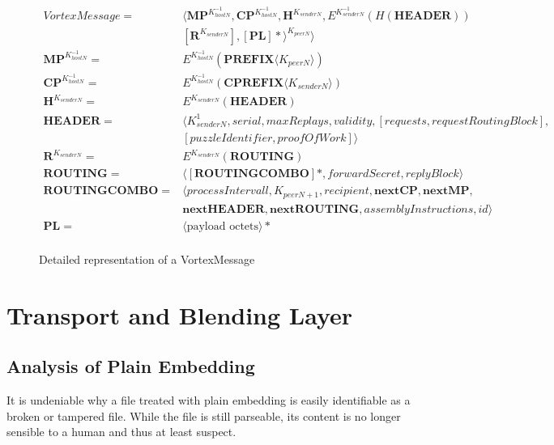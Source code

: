 \begin{figure}[!h]
	\begin{align}
	VortexMessage                = &\langle \mathbf{MP}^{K^{-1}_{hostN}}, \mathbf{CP}^{K^{-1}_{hostN}}, \mathbf{H}^{K_{senderN}}, E^{K^{-1}_{senderN}}\left(H\left(\mathbf{HEADER}\right)\right)  \nonumber \\
	& \left[\mathbf{R}^{K_{senderN}}\right], \left[\mathbf{PL}\right]*\rangle^{K_{peerN}} \rangle\label{eq:vortexMessage}\\ 
	\mathbf{MP}^{K^{-1}_{hostN}} = &E^{K^{-1}_{hostN}}\left(\mathbf{PREFIX}\langle K_{peerN}\rangle \right)\\ 
	\mathbf{CP}^{K^{-1}_{hostN}} = &E^{K^{-1}_{hostN}}\left(\mathbf{CPREFIX}\langle K_{senderN}\rangle \right)\\ 
	\mathbf{H}^{K_{senderN}}     = &E^{K_{senderN}}\left(\mathbf{HEADER}\right)\\  
	\mathbf{HEADER}              = &\langle K^{1}_{senderN}, serial, maxReplays, validity, [requests, requestRoutingBlock],\nonumber\\ 
	& [puzzleIdentifier, proofOfWork] \rangle \\  
	\mathbf{R}^{K_{senderN}}     = & E^{K_{senderN}}\left(\mathbf{ROUTING}\right)\\ 
	\mathbf{ROUTING}             = & \langle [ \mathbf{ROUTINGCOMBO} ] *, forwardSecret, replyBlock \rangle\\  
	\mathbf{ROUTINGCOMBO}        = & \langle processIntervall, K_{peerN+1}, recipient, \mathbf{nextCP}, \mathbf{nextMP}, \nonumber \\
	& \mathbf{nextHEADER}, \mathbf{nextROUTING}, assemblyInstructions, id \rangle\\
	\mathbf{PL}                  = &\langle \text{payload octets} \rangle *\\ 
	\end{align}
	\caption{Detailed representation of a VortexMessage}
\end{figure}

\section{Transport and Blending Layer}

\subsection{Analysis of Plain Embedding}
It is undeniable why a file treated with plain embedding is easily identifiable as a broken or tampered file. While the file is still parseable, its content is no longer sensible to a human and thus at least suspect. 

